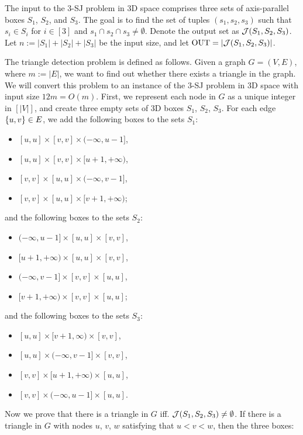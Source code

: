 The input to the 3-SJ problem in 3D space comprises
 three sets of axis-parallel boxes $S_1$, $S_2$, and $S_3$. 
The goal is to find the set of tuples $(s_1,s_2,s_3)$ such that $s_i \in S_i$ for $i \in [3]$ and $s_1 \cap s_2 \cap s_3 \neq \emptyset$. Denote the output set as $\mathcal{J}(S_1,S_2,S_3)$.
Let $n:=|S_1|+|S_2|+|S_3|$ be the input size, and let $\mathrm{OUT} = |\mathcal{J}(S_1,S_2,S_3)|$.

The triangle detection problem is defined as follows. Given a graph $G = (V,E)$, where $m:=|E|$, we want to find out whether there exists a triangle in the graph. We will convert this problem to an instance of the 3-SJ problem in 3D space with input size $12m=O(m)$. First, we represent each node in $G$ as a unique integer in $[|V|]$, and create three empty sets of 3D boxes $S_1$, $S_2$, $S_3$. For each edge $\{u,v\}\in E$, we add the following boxes to the sets $S_1$:
\begin{itemize}
    \item $[u,u]\times [v,v]\times(-\infty,u-1]$,
    \item $[u,u]\times [v,v]\times[u+1,+\infty)$,
    \item $[v,v]\times [u,u] \times (-\infty,v-1]$,
    \item $[v,v]\times [u,u] \times [v+1,+\infty)$;
\end{itemize}
and the following boxes to the sets $S_2$:
\begin{itemize}
    \item $(-\infty,u-1]\times[u,u]\times [v,v]$,
    \item $[u+1,+\infty)\times[u,u]\times [v,v]$,
    \item $(-\infty,v-1] \times[v,v]\times [u,u]$,
    \item $ [v+1,+\infty)\times [v,v]\times [u,u]$;
\end{itemize}
and the following boxes to the sets $S_3$:
\begin{itemize}
    \item $[u,u]\times[v+1,\infty)\times [v,v]$,
    \item $[u,u]\times(-\infty,v-1]\times [v,v]$,
    \item $[v,v]\times[u+1,+\infty)\times [u,u]$,
    \item $[v,v]\times(-\infty,u-1]\times [u,u]$.
\end{itemize}
Now we prove that there is a triangle in $G$ iff.
 $\mathcal{J}(S_1,S_2,S_3) \neq \emptyset$. If there is a triangle in $G$ with nodes $u$, $v$, $w$  satisfying that $u < v < w$, then the three boxes:
